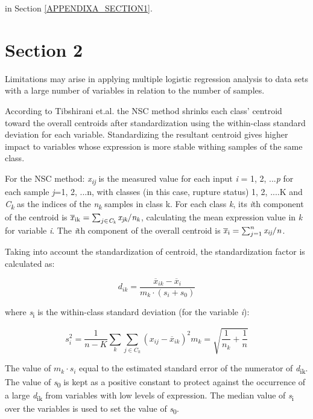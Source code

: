    in 
Section \ref{APPENDIXA_SECTION1}.

\section{Section 2}\label{Nearest Shrunken Centroid}
Limitations may arise in applying multiple logistic regression analysis to data sets with a large number of variables in relation to the number of samples.


According to Tibshirani et.al. \cite{tibshirani2002diagnosis} the NSC method shrinks each class' centroid toward the overall centroids after standardization using the within-class standard deviation for each variable. Standardizing the resultant centroid gives higher impact to variables whose expression is more stable withing samples of the same class. 

For the NSC method: \textit{x\textsubscript{ij}} is the measured value for each input \textit{i}  = 1, 2, ...\textit{p} for each sample \textit{j}=1, 2, ...n, with classes (in this case, rupture status) 1, 2, ....K and \textit{C\textsubscript{k}} as the indices of the \textit{n\textsubscript{k}} samples in class k. For each class \textit{k}, its \textit{i}th component of the centroid is $\overline{\mbox{\textit{x}}}\textsubscript{ik} = \sum_{j\in \textit{C\textsubscript{k}}} \textit{x\textsubscript{jk}}/\textit{n\textsubscript{k}}$, calculating the mean expression value in \textit{k} for variable \textit{i}. The \textit{i}th component of the overall centroid is $\overline{\mbox{\textit{x}}}\textsubscript{i} = \sum_{j=1}^{n} \textit{x\textsubscript{ij}} / \textit{n}$.

Taking into account the standardization of centroid, the standardization factor is calculated as:

\begin{equation} \label{NSC_d}
d_{ik} = \frac{\overline{x}_{ik} - \overline{x}_i}{m_k \cdot (s_i + s_0)}
\end{equation}

where \textit{s}\textsubscript{i} is the within-class standard deviation (for the variable \textit{i}):

\begin{equation}
s_i^2 = \frac{1}{n-K} \sum_k \sum_{j \in C_k} (x_{ij} - \overline{x}_{ik})^2
m_k = \sqrt{\frac{1}{n_k} + \frac{1}{n}}
\end{equation}

The value of $m_k \cdot s_i$ equal to the estimated standard error of the numerator of \textit{d}\textsubscript{ik}. The value of \textit{s}\textsubscript{0} is kept as a positive constant to protect against the occurrence of a large \textit{d}\textsubscript{ik} from variables with low levels of expression. The median value of \textit{s}\textsubscript{i} over the variables is used to set the value of \textit{s}\textsubscript{0}.

